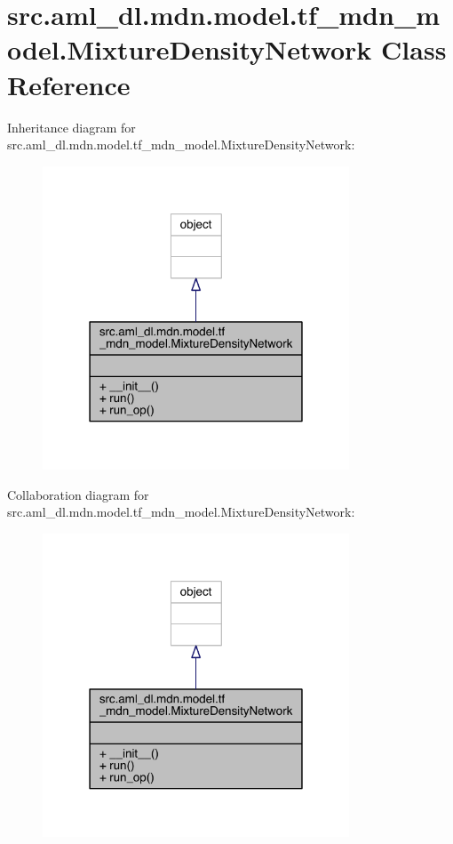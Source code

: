 \hypertarget{classsrc_1_1aml__dl_1_1mdn_1_1model_1_1tf__mdn__model_1_1_mixture_density_network}{}\section{src.\+aml\+\_\+dl.\+mdn.\+model.\+tf\+\_\+mdn\+\_\+model.\+Mixture\+Density\+Network Class Reference}
\label{classsrc_1_1aml__dl_1_1mdn_1_1model_1_1tf__mdn__model_1_1_mixture_density_network}


Inheritance diagram for src.\+aml\+\_\+dl.\+mdn.\+model.\+tf\+\_\+mdn\+\_\+model.\+Mixture\+Density\+Network\+:\nopagebreak
\begin{figure}[H]
\begin{center}
\leavevmode
\includegraphics[width=259pt]{classsrc_1_1aml__dl_1_1mdn_1_1model_1_1tf__mdn__model_1_1_mixture_density_network__inherit__graph}
\end{center}
\end{figure}


Collaboration diagram for src.\+aml\+\_\+dl.\+mdn.\+model.\+tf\+\_\+mdn\+\_\+model.\+Mixture\+Density\+Network\+:\nopagebreak
\begin{figure}[H]
\begin{center}
\leavevmode
\includegraphics[width=259pt]{classsrc_1_1aml__dl_1_1mdn_1_1model_1_1tf__mdn__model_1_1_mixture_density_network__coll__graph}
\end{center}
\end{figure}
